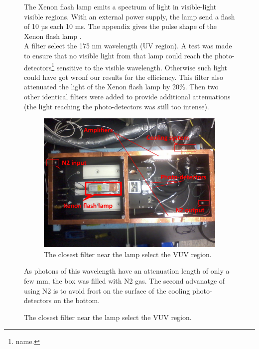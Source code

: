 \documentclass[a4paper, 11pt]{report}%
\newcommand{\xfl}{Xenon flash lamp }
\begin{document}
\begin{figure}[!hbtp]
  
  The \xfl emits a spectrum of light in visible-light visible regions. With an external power supply, the lamp send a flash of 10 µs each 
  10 ms. The appendix gives the pulse shape of the \xfl.\\
  A filter select the 175 nm wavelength (UV region). 
  A test was made to ensure that no visible light from that lamp could reach the photo-detectors\footnote{name.} sensitive to the visible wavelength. 
  Otherwise such light could have got wronf our results for the efficiency.
  This filter also attenuated the light of the \xfl by 20\%. Then two other 
  identical filters were added to provide additional attenuations (the light reaching the photo-detectors was still too intense). 
  \\
  
  \centering
  \begin{figure}[!hbtp]  
    \includegraphics[totalheight=.35\textwidth,trim=0cm 7cm 0cm 2.5cm, clip=true,]{../Pictures/blabla/box.jpg}
    \caption{The closest filter near the lamp select the VUV region.}
    \label{fig:filter_specification}
  \end{figure}
  
  As photons of this wavelength have an attenuation length of only a few mm, the box was filled with N2 gas. The second advanatge of using 
  N2 is to avoid frost on the surface of the cooling photo-detectors on the bottom.
   

\end{figure}
\end{document}
